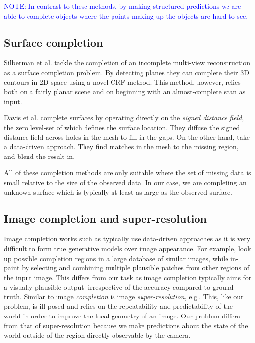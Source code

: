 \documentclass[10pt,twocolumn,letterpaper]{article}
\makeatletter
\renewcommand*{\eg}{e.g.\@\xspace}
\newcommand*{\ea}{et al.\@\xspace}
\newcommand{\note}[1]{\textcolor{blue}{NOTE: #1}}
\makeatother
\begin{document}
\note{In contrast to these methods, by making structured predictions we are able to complete objects where the points making up the objects are hard to see.}



\subsection{Surface completion}

Silberman \ea \cite{silberman-eccv-2014} tackle the completion of an incomplete multi-view reconstruction as a surface completion problem.
By detecting planes they can complete their 3D contours in 2D space using a novel CRF method.
This method, however, relies both on a fairly planar scene and on beginning with an almost-complete scan as input.

Davis \ea \cite{davis-3dpvt-2002} complete surfaces by operating directly on the \emph{signed distance field}, the zero level-set of which defines the surface location. They diffuse the signed distance field across holes in the mesh to fill in the gaps.
On the other hand, \cite{harary-tog-2013} take a data-driven approach.
They find matches in the mesh to the missing region, and blend the result in.

All of these completion methods are only suitable where the set of missing data is small relative to the size of the observed data.
In our case, we are completing an unknown surface which is typically at least as large as the observed surface.



\subsection{Image completion and super-resolution}

Image completion works such as \cite{hays-siggraph-2007, criminisi-cvpr-2003}
typically use data-driven approaches as it is very difficult to form true generative models over image appearance.
For example, \cite{hays-siggraph-2007} look up possible completion regions in a large database of similar images, while \cite{criminisi-cvpr-2003} in-paint by selecting and combining multiple plausible patches from other regions of the input image.
This differs from our task as image completion typically aims for a visually plausible output, irrespective of the accuracy compared to ground truth.
Similar to image \emph{completion} is image \emph{super-resolution}, \eg \cite{macaodha-eccv-2012}. 
This, like our problem, is ill-posed and relies on the repeatability and predictability of the world in order to improve the local geometry of an image.
Our problem differs from that of super-resolution because we make predictions about the state of the world outside of the region directly observable by the camera.
\end{document}
